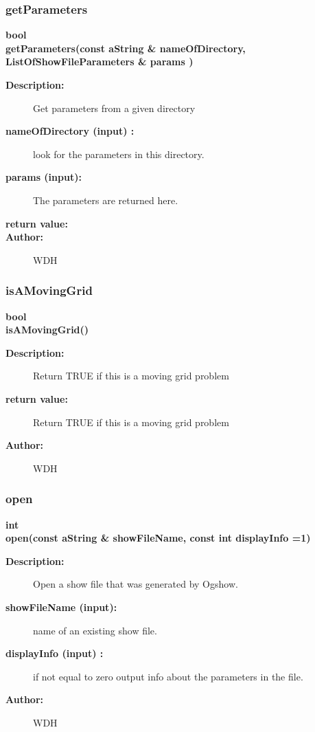 \subsubsection{getParameters}
 
\begin{flushleft} \textbf{%
bool  \\ 
\settowidth{\ShowFileReaderIncludeArgIndent}{getParameters(}%
getParameters(const aString \& nameOfDirectory, ListOfShowFileParameters \& params )
}\end{flushleft}
\begin{description}
\item[{\bf Description:}] 
    Get parameters from a given directory
 
\item[{\bf nameOfDirectory (input) :}]  look for the parameters in this directory.
\item[{\bf params (input):}]  The parameters are returned here.
 
\item[{\bf return value:}]  
\item[{\bf Author:}]  WDH
\end{description}
\subsubsection{isAMovingGrid}
 
\begin{flushleft} \textbf{%
bool  \\ 
\settowidth{\ShowFileReaderIncludeArgIndent}{isAMovingGrid(}%
isAMovingGrid()
}\end{flushleft}
\begin{description}
\item[{\bf Description:}] 
   Return TRUE if this is a moving grid problem
\item[{\bf return value:}]  Return TRUE if this is a moving grid problem
\item[{\bf Author:}]  WDH
\end{description}
\subsubsection{open}
 
\begin{flushleft} \textbf{%
int  \\ 
\settowidth{\ShowFileReaderIncludeArgIndent}{open(}%
open(const aString \& showFileName, const int displayInfo  =1)
}\end{flushleft}
\begin{description}
\item[{\bf Description:}] 
    Open a show file that was generated by Ogshow.
\item[{\bf showFileName (input):}]  name of an existing show file.
\item[{\bf displayInfo (input) :}]  if not equal to zero output info about the parameters in the file.
\item[{\bf Author:}]  WDH
\end{description}
